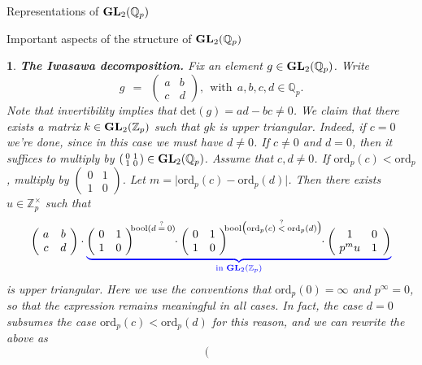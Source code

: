 \documentclass[letterpaper,11pt, reqno]{amsart}
\newtheorem{monodromy theorem}{Monodromy Theorem}[subsection]
\newtheorem{wild conjecture}[theorem]{Wild Conjecture}
\newtheorem{research objectives}{Research objectives}[subsection]
\newtheorem{research question}[theorem]{Research questions}
\newtheorem{aside question}[theorem]{Aside question}
\newtheorem{audio example}[theorem]{\loudspeaker[3] Example}
\newtheorem{blank remark}[theorem]{}
\newtheorem{ssubsection}[theorem]{}
\newtheorem{terminology and comment}[theorem]{Terminology and comment}
\newtheorem{purity hypothesis}[theorem]{Purity hypothesis}
\newtheorem{corollary of the purity hypothesis}[theorem]{Corollary of the purity hypothesis}
\newcommand{\QQ} {{\mathbb Q}}
\newcommand{\ZZ} {{\mathbb Z}}
\numberwithin{equation}{theorem}
\begin{document}
\begin{section}{Representations of $\bold{GL}_{2}(\QQ_p)$}
\begin{subsection}{Important aspects of the structure of $\bold{GL}_2(\QQ_p)$}
\begin{ssubsection}
{\bf The Iwasawa decomposition.}
\normalfont
Fix an element $g\in\bold{GL}_2(\QQ_p)$. Write
	$$
	g
	\ \ =\ \ 
	\left(\!
	\begin{array}{rl}
	a & b \\
	c & d
	\end{array}
	\!\right),
	\ \ \text{with}
	\ \ a,b,c,d\in\QQ_p.
	$$
Note that invertibility implies that $\text{det}(g)=ad-bc\neq0$. We claim that there exists a matrix $k\in\bold{GL}_{2}(\ZZ_p)$ such that $gk$ is upper triangular. Indeed, if $c=0$ we're done, since in this case we must have $d\neq0$. If $c\neq0$ and $d=0$, then it suffices to multiply by $\left(\begin{smallmatrix} 0 & 1\\ 1 & 0 \end{smallmatrix}\right)\in\bold{GL}_{2}(\QQ_p)$. Assume that $c,d\neq0$. If $\text{ord}_p(c)<\text{ord}_{p}$, multiply by $\left(\begin{smallmatrix} 0 & 1\\ 1 & 0 \end{smallmatrix}\right)$. Let $m=\big|\text{ord}_p(c)-\text{ord}_{p}(d)\big|$. Then there exists $u\in\ZZ^\times_p$ such that
	$$
	\left(\!
	\begin{array}{cc}
	a & b \\
	c & d
	\end{array}
	\!\right)
	\cdot
	{\color{blue}
	\underset{\text{in\ }\bold{GL}_{2}(\ZZ_p)}{
	\underbrace{
	{\color{black}
	\left(\!
	\begin{array}{cc}
	0 & 1 \\
	1 & 0
	\end{array}
	\!\right)^{\!\!\text{bool}(d\ \!\overset{?}{=}\ \!0)}
	\!\!
	\cdot
	\left(\!
	\begin{array}{cc}
	0 & 1 \\
	1 & 0
	\end{array}
	\!\right)^{\!\!\text{bool}\big(\text{ord}_p(c)\ \!\overset{?}{<}\ \!\text{ord}_{p}(d)\big)}
	\!\!
	\cdot
	\left(\!
	\begin{array}{cc}
	1 & 0 \\
	p^{m}u & 1
	\end{array}
	\right)
	}
	}
	}
	}
	$$
is upper triangular. Here we use the conventions that $\text{ord}_{p}(0)=\infty$ and $p^\infty=0$, so that the expression remains meaningful in all cases. In fact, the case $d=0$ subsumes the case $\text{ord}_{p}(c)<\text{ord}_{p}(d)$ for this reason, and we can rewrite the above as
	$$
	\left(\!
	\begin{array}{cc}

\end{array}$$
\end{ssubsection}
\end{subsection}
\end{section}
\end{document}
